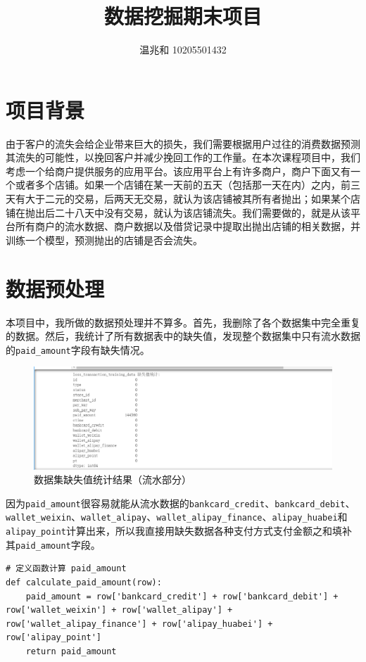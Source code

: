 \documentclass{article}
\title{数据挖掘期末项目}
\author{温兆和 10205501432}
\begin{document}
\maketitle

\section{项目背景}
由于客户的流失会给企业带来巨大的损失，我们需要根据用户过往的消费数据预测其流失的可能性，以挽回客户并减少挽回工作的工作量。在本次课程项目中，我们考虑一个给商户提供服务的应用平台。该应用平台上有许多商户，商户下面又有一个或者多个店铺。如果一个店铺在某一天前的五天（包括那一天在内）之内，前三天有⼤于二元的交易，后两天⽆交易，就认为该店铺被其所有者抛出；如果某个店铺在抛出后二十八天中没有交易，就认为该店铺流失。我们需要做的，就是从该平台所有商户的流水数据、商户数据以及借贷记录中提取出抛出店铺的相关数据，并训练一个模型，预测抛出的店铺是否会流失。

\section{数据预处理}
本项目中，我所做的数据预处理并不算多。首先，我删除了各个数据集中完全重复的数据。然后，我统计了所有数据表中的缺失值，发现整个数据集中只有流水数据的\lstinline{paid_amount}字段有缺失情况。

\begin{figure}[h]
    \centering
    \includegraphics[width=0.75\linewidth]{img/image01.png}
    \caption{数据集缺失值统计结果（流水部分）}
    \label{fig:enter-label}
\end{figure}

因为\lstinline{paid_amount}很容易就能从流水数据的\lstinline{bankcard_credit}、\lstinline{bankcard_debit}、\lstinline{wallet_weixin}、\lstinline{wallet_alipay}、\lstinline{wallet_alipay_finance}、\lstinline{alipay_huabei}和\lstinline{alipay_point}计算出来，所以我直接用缺失数据各种支付方式支付金额之和填补其\lstinline{paid_amount}字段。

\begin{lstlisting}
# 定义函数计算 paid_amount
def calculate_paid_amount(row):
    paid_amount = row['bankcard_credit'] + row['bankcard_debit'] + row['wallet_weixin'] + row['wallet_alipay'] + row['wallet_alipay_finance'] + row['alipay_huabei'] + row['alipay_point']
    return paid_amount
\end{lstlisting}
\end{document}
